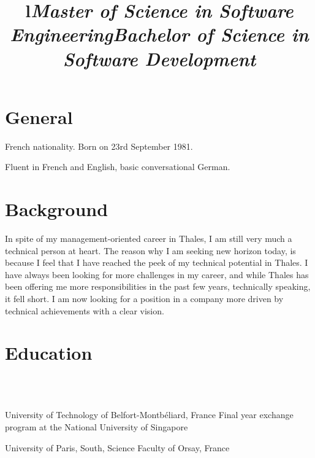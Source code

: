 \documentclass[overlapped,line,letterpaper]{res}
\begin{document}
\begin{resume}


  \section{\bf General}
  French nationality. Born on 23rd September 1981.

  Fluent in French and English, basic conversational German.


  \section{\bf Background}

  In spite of my management-oriented career in Thales, I am still very much a
  technical person at heart. The reason why I am seeking new horizon today, is
  because I feel that I have reached the peek of my technical potential in
  Thales. I have always been looking for more challenges in my career, and while
  Thales has been offering me more responsibilities in the past few years,
  technically speaking, it fell short. I am now looking for a position in a
  company more driven by technical achievements with a clear vision.


  \section{\bf Education}

  \begin{format}
    \title{l}\\
    \body\\
  \end{format}

  \title{\em Master of Science in Software Engineering}
  \begin{position}
    University of Technology of Belfort-Montb\'{e}liard, France\newline
    Final year exchange program at the National University of Singapore
  \end{position}

  \title{\em Bachelor of Science in Software Development}
  \begin{position}
    University of Paris, South, Science Faculty of Orsay, France
  \end{position}


\end{resume}
\end{document}
